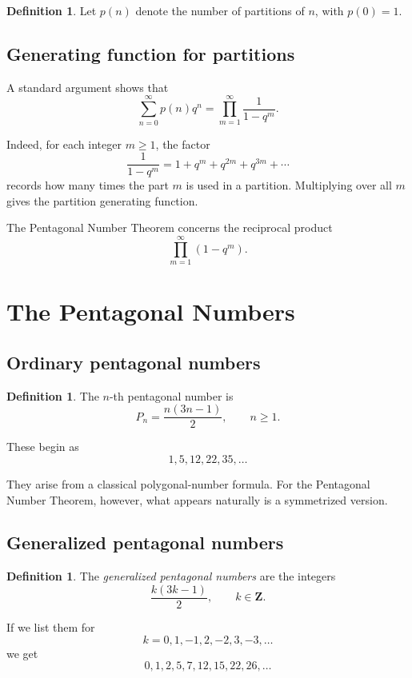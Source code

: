 \documentclass[11pt]{article}
\theoremstyle{definition}
\newtheorem{definition}[theorem]{Definition}
\theoremstyle{remark}
\newcommand{\ZZ}{\mathbf{Z}}
\begin{document}
	\begin{definition}
		Let \(p(n)\) denote the number of partitions of \(n\), with \(p(0)=1\).
	\end{definition}
	
	\subsection{Generating function for partitions}
	
	A standard argument shows that
	\[
	\sum_{n=0}^{\infty} p(n) q^n
	=
	\prod_{m=1}^{\infty}\frac{1}{1-q^m}.
	\]
	
	Indeed, for each integer \(m\ge 1\), the factor
	\[
	\frac{1}{1-q^m}=1+q^m+q^{2m}+q^{3m}+\cdots
	\]
	records how many times the part \(m\) is used in a partition. Multiplying over all \(m\) gives the partition generating function.
	
	The Pentagonal Number Theorem concerns the reciprocal product
	\[
	\prod_{m=1}^{\infty}(1-q^m).
	\]
	
	\section{The Pentagonal Numbers}
	
	\subsection{Ordinary pentagonal numbers}
	
	\begin{definition}
		The \(n\)-th pentagonal number is
		\[
		P_n=\frac{n(3n-1)}{2},
		\qquad n\ge 1.
		\]
	\end{definition}
	
	These begin as
	\[
	1,5,12,22,35,\dots
	\]
	
	They arise from a classical polygonal-number formula. For the Pentagonal Number Theorem, however, what appears naturally is a symmetrized version.
	
	\subsection{Generalized pentagonal numbers}
	
	\begin{definition}
		The \emph{generalized pentagonal numbers} are the integers
		\[
		\frac{k(3k-1)}{2},
		\qquad k\in \ZZ.
		\]
	\end{definition}
	
	If we list them for
	\[
	k=0,1,-1,2,-2,3,-3,\dots
	\]
	we get
	\[
	0,1,2,5,7,12,15,22,26,\dots
	\]
	
\end{document}
